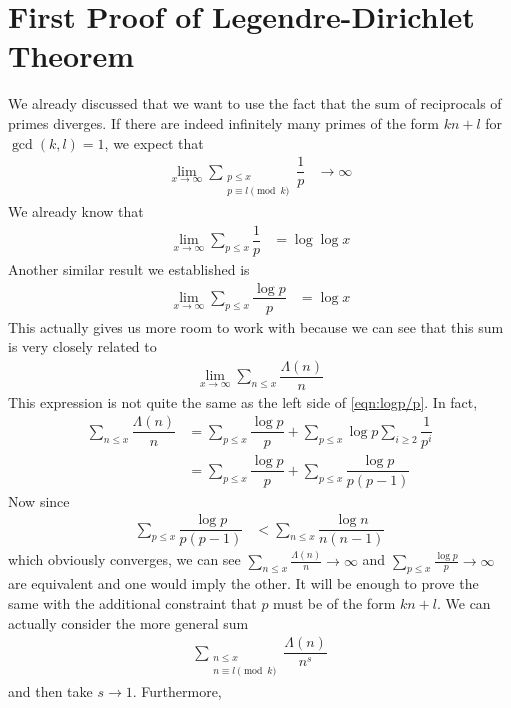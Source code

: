 \documentclass[elemannt.tex]{subfile}
\begin{document}
	\section{First Proof of Legendre-Dirichlet Theorem}
	We already discussed that we want to use the fact that the sum of reciprocals of primes diverges. If there are indeed infinitely many primes of the form $kn+l$ for $\gcd(k,l)=1$, we expect that
		\begin{align*}
			\lim_{x\to\infty}\sum_{\substack{p\leq x\\p\equiv l\pmod{k}}}\dfrac{1}{p}
				& \to\infty
		\end{align*}
	We already know that
		\begin{align*}
			\lim_{x\to\infty}\sum_{p\leq x}\dfrac{1}{p}
				& = \log{\log{x}}
		\end{align*}
	Another similar result we established is
		\begin{align}
			\lim_{x\to\infty}\sum_{p\leq x}\dfrac{\log{p}}{p}
			& = \log{x}\label{eqn:logp/p}
		\end{align}
	This actually gives us more room to work with because we can see that this sum is very closely related to
		\begin{align*}
			\lim_{x\to\infty}\sum_{n\leq x}\dfrac{\Lambda(n)}{n}
		\end{align*}
	This expression is not quite the same as the left side of \eqref{eqn:logp/p}. In fact,
		\begin{align*}
			\sum_{n\leq x}\dfrac{\Lambda(n)}{n}
				& = \sum_{p\leq x}\dfrac{\log{p}}{p}+\sum_{p\leq x}\log{p}\sum_{i\geq2}\dfrac{1}{p^{i}}\\
				& = \sum_{p\leq x}\dfrac{\log{p}}{p}+\sum_{p\leq x}\dfrac{\log{p}}{p(p-1)}
		\end{align*}
	Now since
		\begin{align*}
			\sum_{p\leq x}\dfrac{\log{p}}{p(p-1)} & < \sum_{n\leq x}\dfrac{\log{n}}{n(n-1)}
		\end{align*}
	which obviously converges, we can see $\sum_{n\leq x}\frac{\Lambda(n)}{n}\to\infty$ and $\sum_{p\leq x}\frac{\log{p}}{p}\to\infty$ are equivalent and one would imply the other. It will be enough to prove the same with the additional constraint that $p$ must be of the form $kn+l$. We can actually consider the more general sum
		\begin{align*}
			\sum_{\substack{n\leq x\\n\equiv l\pmod{k}}}\dfrac{\Lambda(n)}{n^{s}}
		\end{align*}
	and then take $s\to1$. Furthermore,
\end{document}
